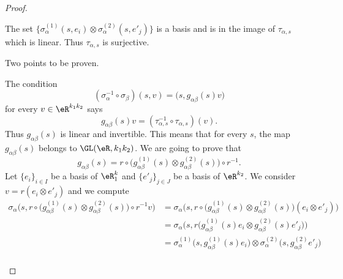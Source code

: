 \begin{proof}
\begin{subproof}
\begin{subproof}
			\spitem[Surjective]
			The set \(    	\{ \sigma_{\alpha}^{(1)}(s,e_i)\otimes \sigma_{\alpha}^{(2)}(s,e'_j) \}  \) is a basis and is in the image of \( \tau_{\alpha,s}\) which is linear. Thus \( \tau_{\alpha,s}\) is surjective.
		\end{subproof}
		Two points to be proven.
		\begin{subproof}
			The condition
			\begin{equation}
				(\sigma_{\alpha}^{-1}\circ\sigma_{\beta})(s,v)=\big( s,g_{\alpha\beta}(s)v \big)
			\end{equation}
			for every \( v\in \eR^{k_1k_2}\) says
			\begin{equation}
				g_{\alpha\beta}(s)v=(\tau_{\alpha,s}^{-1}\circ\tau_{\alpha,s})(v).
			\end{equation}
			Thus \( g_{\alpha\beta}(s)\) is linear and invertible. This means that for every \( s\), the map \( g_{\alpha\beta}(s)\) belongs to \(\GL(\eR, k_1k_2)\).
			We are going to prove that
			\begin{equation}\label{EQooAUMXooCoqPTO}
				g_{\alpha\beta}(s)=r\circ\big( g_{\alpha\beta}^{(1)}(s)\otimes g_{\alpha\beta}^{(2)}(s) \big)\circ r^{-1}.
			\end{equation}
			Let \( \{ e_i \}_{i\in I}\) be a basis of \( \eR^k_1\) and \( \{ e'_j \}_{j\in J}\) be a basis of \( \eR^{k_2}\). We consider \( v=r(e_i\otimes e'_j)\) and we compute
			\begin{subequations}		\label{EQSooUIMFooMBbBvp}
				\begin{align}
					\sigma_{\alpha}\Big( s,  r\circ\big( g_{\alpha\beta}^{(1)}(s)\otimes g_{\alpha\beta}^{(2)}(s) \big)\circ r^{-1}v \Big)
					 & =\sigma_{\alpha}\Big(  s, r\circ\big( g_{\alpha\beta}^{(1)}(s)\otimes g_{\alpha\beta}^{(2)}(s) \big)(e_i\otimes e'_j)   \Big)                                                          \\
					 & =\sigma_{\alpha}\Big( s,r\big( g_{\alpha\beta}^{(1)}(s)e_i\otimes g_{\alpha\beta}^{(2)}(s)e'_j \big) \Big)                                                                             \\
					 & = \sigma_{\alpha}^{(1)}\big( s,g_{\alpha\beta}^{(1)}(s)e_i \big)\otimes \sigma_{\alpha}^{(2)}\big( s,g_{\alpha\beta}^{(2)}e'_j \big)                                                   \\

\end{align}
\end{subequations}
\end{subproof}
\end{subproof}
\end{proof}

